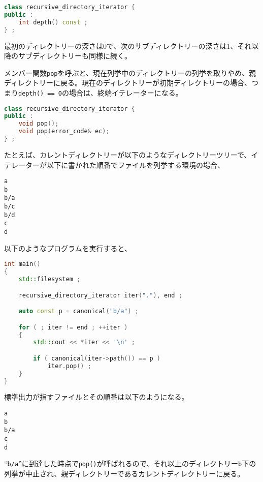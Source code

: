 \begin{lstlisting}[language=C++]
class recursive_directory_iterator {
public :
    int depth() const ;
} ;
\end{lstlisting}

最初のディレクトリーの深さは0で、次のサブディレクトリーの深さは1、それ以降のサブディレクトリーも同様に続く。

%

メンバー関数\lstinline!pop!を呼ぶと、現在列挙中のディレクトリーの列挙を取りやめ、親ディレクトリーに戻る。現在のディレクトリーが初期ディレクトリーの場合、つまり\lstinline!depth() == 0!の場合は、終端イテレーターになる。

\begin{lstlisting}[language=C++]
class recursive_directory_iterator {
public :
    void pop();
    void pop(error_code& ec);
} ;
\end{lstlisting}

たとえば、カレントディレクトリーが以下のようなディレクトリーツリーで、イテレーターが以下に書かれた順番でファイルを列挙する環境の場合、
\begin{lstlisting}
a
b
b/a
b/c
b/d
c
d
\end{lstlisting}
以下のようなプログラムを実行すると、
\begin{lstlisting}[language=C++]
int main()
{
    std::filesystem ;

    recursive_directory_iterator iter("."), end ;

    auto const p = canonical("b/a") ;

    for ( ; iter != end ; ++iter )
    {
        std::cout << *iter << '\n' ;

        if ( canonical(iter->path()) == p )
            iter.pop() ;
    }
}
\end{lstlisting}
標準出力が指すファイルとその順番は以下のようになる。
\begin{lstlisting}
a
b
b/a
c
d
\end{lstlisting}

``\lstinline!b/a!''に到達した時点で\lstinline!pop()!が呼ばれるので、それ以上のディレクトリー\lstinline!b!下の列挙が中止され、親ディレクトリーであるカレントディレクトリーに戻る。

%

